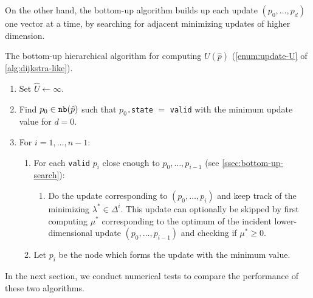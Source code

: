 \documentclass[eikonal.tex]{subfiles}
\begin{document}
On the other hand, the bottom-up algorithm builds up each update
$(p_0, \hdots, p_d)$ one vector at a time, by searching for adjacent
minimizing updates of higher dimension.

\begin{algorithm}[H]
  \caption{The bottom-up hierarchical algorithm for computing
    $U(\hat{p})$ (\cref{enum:update-U} of
    \cref{alg:dijkstra-like}).}\label{alg:bottom-up}
  \begin{enumerate}[nolistsep]
  \item Set $\hat{U} \gets \infty$.
  \item Find $p_0 \in \texttt{nb}(\hat{p})$ such that $p_0$\texttt{.state}
    $=$ \texttt{valid} with the minimum update value for $d = 0$.
  \item For $i = 1, \hdots, n - 1$:
    \begin{enumerate}
    \item For each \texttt{valid} $p_i$ close enough to
      $p_0, \hdots, p_{i-1}$ (see
      \cref{ssec:bottom-up-search}):\label{item:bottom-up-for}
      \begin{enumerate}
      \item Do the update corresponding to $(p_0, \hdots, p_i)$ and
        keep track of the minimizing $\lambda^* \in \Delta^i$. This
        update can optionally be skipped by first computing $\mu^*$
        corresponding to the optimum of the incident lower-dimensional
        update $(p_0, \hdots, p_{i-1})$ and checking if
        $\mu^* \geq 0$.
      \end{enumerate}
    \item Let $p_i$ be the node which forms the update with the
      minimum value.
    \end{enumerate}
  \end{enumerate}
\end{algorithm}

In the next section, we conduct numerical tests to compare the
performance of these two algorithms.
\end{document}
